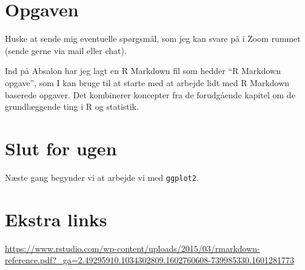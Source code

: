 \documentclass[
]{book}
\begin{document}
\hypertarget{opgaven}{%
\section{Opgaven}\label{opgaven}}

Huske at sende mig eventuelle spørgsmål, som jeg kan svare på i Zoom rummet (sende gerne via mail eller chat).

Ind på Absalon har jeg lagt en R Markdown fil som hedder ``R Markdown opgave'', som I kan bruge til at starte med at arbejde lidt med R Markdown baserede opgaver. Det kombinerer koncepter fra de forudgående kapitel om de grundlæggende ting i R og statistik.

\hypertarget{slut-for-ugen}{%
\section{Slut for ugen}\label{slut-for-ugen}}

Næste gang begynder vi at arbejde vi med \texttt{ggplot2}.

\hypertarget{ekstra-links}{%
\section{Ekstra links}\label{ekstra-links}}

\url{https://www.rstudio.com/wp-content/uploads/2015/03/rmarkdown-reference.pdf?_ga=2.49295910.1034302809.1602760608-739985330.1601281773}

  
\end{document}
